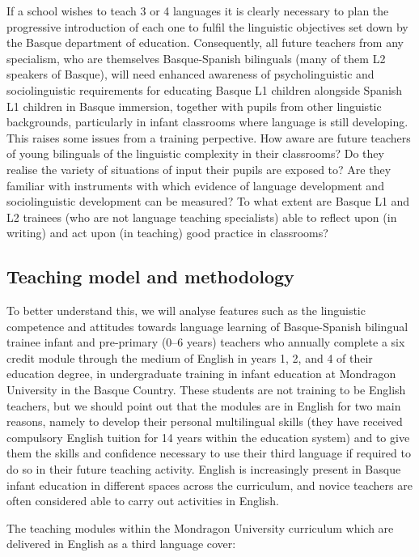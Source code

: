 \documentclass[output=paper]{../langscibook}
\begin{document}
If a school wishes to teach 3 or 4 languages it is clearly necessary to plan the progressive introduction of each one to fulfil the linguistic objectives set down by the Basque department of education. Consequently, all future teachers from any specialism, who are themselves Basque-Spanish bilinguals (many of them L2 speakers of Basque), will need enhanced awareness of psycholinguistic and sociolinguistic requirements for educating Basque L1 children alongside Spanish L1 children in Basque immersion, together with pupils from other linguistic backgrounds, particularly in infant classrooms where language is still developing. This raises some issues from a training perpective.  How aware are future teachers of young bilinguals of the linguistic complexity in their classrooms? Do they realise the variety of situations of input their pupils are exposed to? Are they familiar with instruments with which evidence of language development and sociolinguistic development can be measured? To what extent are Basque L1 and L2 trainees (who are not language teaching specialists) able to reflect upon (in writing) and act upon (in teaching) good practice in classrooms?


\subsection{Teaching model and methodology}


To better understand this, we will analyse features such as the linguistic competence and attitudes towards language learning of Basque-Spanish bilingual trainee infant and pre-primary (0--6 years) teachers who annually complete a six credit module through the medium of English in years 1, 2, and 4 of their education degree, in undergraduate training in infant education at Mondragon University in the Basque Country. These students are not training to be English teachers, but we should point out that the modules are in English for two main reasons, namely to develop their personal multilingual skills (they have received compulsory English tuition for 14 years within the education system) and to give them the skills and confidence necessary to use their third language if required to do so in their future teaching activity. English is increasingly present in Basque infant education in different spaces across the curriculum, and novice teachers are often considered able to carry out activities in English.

The teaching modules within the Mondragon University curriculum which are delivered in English as a third language cover:
\end{document}
